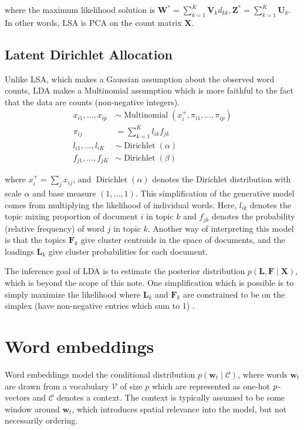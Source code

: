 \documentclass{amsart}
\DeclareMathOperator\Dir{Dirichlet}
\newcommand\vw{\symbf{w}}
\newcommand\mx{\symbf{X}}
\newcommand\ml{\symbf{L}}
\newcommand\mf{\symbf{F}}
\newcommand\mU{\symbf{U}}
\newcommand\mv{\symbf{V}}
\newcommand\mw{\symbf{W}}
\newcommand\mz{\symbf{Z}}
\begin{document}
where the maximum likelihood solution is \(\mw^* = \sum_{k=1}^K \mv_k d_{kk},
\mz^* = \sum_{k=1}^K \mU_k\). In other words, LSA is PCA on the count matrix
\(\mx\).

\subsection{Latent Dirichlet Allocation}

Unlike LSA, which makes a Gaussian assumption about the observed word counts,
LDA \cite{Blei2003} makes a Multinomial assumption which is more faithful to
the fact that the data are counts (non-negative integers).
%
\begin{align}
  x_{i1}, \ldots, x_{ip} &\sim \operatorname{Multinomial}(x_i^+, \pi_{i1}, \ldots, \pi_{ip})\\
  \pi_{ij} &= \sum_{k=1}^K l_{ik} f_{jk}\\
  l_{i1}, \ldots, l_{iK} &\sim \Dir(\alpha)\\
  f_{j1}, \ldots, f_{jK} &\sim \Dir(\beta)
\end{align}

where \(x_i^+ = \sum_j x_{ij}\), and \(\Dir(\alpha)\) denotes the Dirichlet
distribution with scale \(\alpha\) and base measure \((1, \ldots, 1)\). This
simplification of the generative model comes from multiplying the likelihood of
individual words. Here, \(l_{ik}\) denotes the topic mixing proportion of
document \(i\) in topic \(k\) and \(f_{jk}\) denotes the probability (relative
frequency) of word \(j\) in topic \(k\). Another way of interpreting this model
is that the topics \(\mf_k\) give cluster centroids in the space of documents,
and the loadings \(\ml_k\) give cluster probabilities for each document.

The inference goal of LDA is to estimate the posterior distribution \(p(\ml,
\mf \mid \mx)\), which is beyond the scope of this note. One simplification
which is possible is to simply maximize the likelihood
where \(\ml_k\) and \(\mf_k\) are constrained to be on the simplex (have
non-negative entries which sum to 1) \cite{Engelhardt2007}.

\section{Word embeddings}

Word embeddings model the conditional distribution \(p(\vw_t \mid
\mathcal{C})\), where words \(\vw_t\) are drawn from a vocabulary
\(\mathcal{V}\) of size \(p\) which are represented as one-hot
\(p\mkern+1mu\)-vectors and \(\mathcal{C}\) denotes a context. The context is
typically assumed to be some window around \(\vw_t\), which introduces spatial
relevance into the model, but not necessarily ordering.
\end{document}
